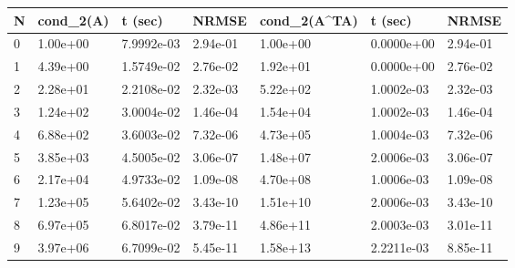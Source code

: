 \documentclass{article}
\begin{document}
\begin{table}[]
\begin{tabular}{|l|l|l|l|l|l|l|}
\hline
N & cond\_2(A) & t (sec)    & NRMSE    & cond\_2(A\textasciicircum{}TA) & t (sec)    & NRMSE    \\ \hline
0 & 1.00e+00   & 7.9992e-03 & 2.94e-01 & 1.00e+00                       & 0.0000e+00 & 2.94e-01 \\ \hline
1 & 4.39e+00   & 1.5749e-02 & 2.76e-02 & 1.92e+01                       & 0.0000e+00 & 2.76e-02 \\ \hline
2 & 2.28e+01   & 2.2108e-02 & 2.32e-03 & 5.22e+02                       & 1.0002e-03 & 2.32e-03 \\ \hline
3 & 1.24e+02   & 3.0004e-02 & 1.46e-04 & 1.54e+04                       & 1.0002e-03 & 1.46e-04 \\ \hline
4 & 6.88e+02   & 3.6003e-02 & 7.32e-06 & 4.73e+05                       & 1.0004e-03 & 7.32e-06 \\ \hline
5 & 3.85e+03   & 4.5005e-02 & 3.06e-07 & 1.48e+07                       & 2.0006e-03 & 3.06e-07 \\ \hline
6 & 2.17e+04   & 4.9733e-02 & 1.09e-08 & 4.70e+08                       & 1.0006e-03 & 1.09e-08 \\ \hline
7 & 1.23e+05   & 5.6402e-02 & 3.43e-10 & 1.51e+10                       & 2.0006e-03 & 3.43e-10 \\ \hline
8 & 6.97e+05   & 6.8017e-02 & 3.79e-11 & 4.86e+11                       & 2.0003e-03 & 3.01e-11 \\ \hline
9 & 3.97e+06   & 6.7099e-02 & 5.45e-11 & 1.58e+13                       & 2.2211e-03 & 8.85e-11 \\ \hline
\end{tabular}
\end{table}
\end{document}
